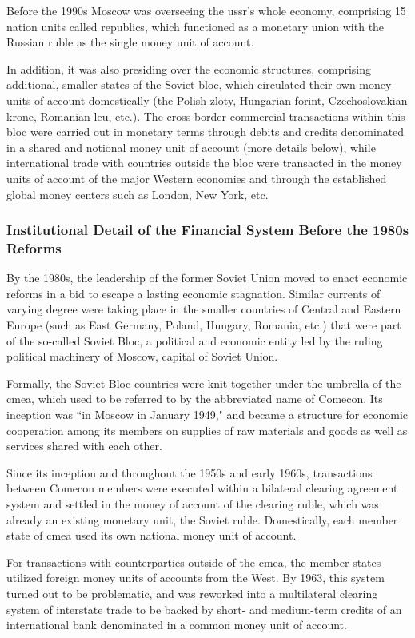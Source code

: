 Before the 1990s Moscow was overseeing the \ac{ussr}'s whole economy, comprising 15 nation units called republics, which functioned as a monetary union with the Russian ruble as the single money unit of account. 

In addition, it was also presiding over the economic structures, comprising additional, smaller states of the Soviet bloc, which circulated their own money units of account domestically (the Polish zloty, Hungarian forint, Czechoslovakian krone, Romanian leu, etc.). The cross-border commercial transactions within this bloc were carried out in monetary terms through debits and credits denominated in a shared and notional money unit of account (more details below), while international trade with countries outside the bloc were transacted in the money units of account of the major Western economies and through the established global money centers such as London, New York, etc.

\subsubsection{Institutional Detail of the Financial System Before the 1980s Reforms}

By the 1980s, the leadership of the former Soviet Union moved to enact economic reforms in a bid to escape a lasting economic stagnation. Similar currents of varying degree were taking place in the smaller countries of Central and Eastern Europe (such as East Germany, Poland, Hungary, Romania, etc.) that were part of the so-called Soviet Bloc, a political and economic entity led by the ruling political machinery of Moscow, capital of Soviet Union. 

Formally, the Soviet Bloc countries were knit together under the umbrella of the \acf{cmea}, which used to be referred to by the abbreviated name of Comecon. Its inception was ``in Moscow in January 1949," and became a structure for economic cooperation among its members on supplies of raw materials and goods as well as services shared with each other. 

Since its inception and throughout the 1950s and early 1960s, transactions between Comecon members were executed within a bilateral clearing agreement system and settled in the money of account of the clearing ruble, which was already an existing monetary unit, the Soviet ruble. Domestically, each member state of \ac{cmea} used its own national money unit of account. 

For transactions with counterparties outside of the \ac{cmea}, the member states utilized foreign money units of accounts from the West. By 1963, this system turned out to be problematic, and was reworked into a multilateral clearing system of interstate trade to be backed by short- and medium-term credits of an international bank denominated in a common money unit of account. 


